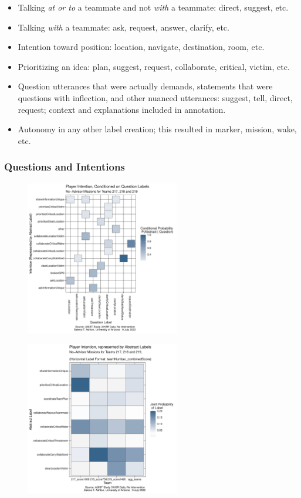 \documentclass[10pt]{article}
\begin{document}
\begin{itemize}
    \item Talking \emph{at or to} a teammate and not \emph{with} a teammate: direct, suggest, etc.
    \item Talking \emph{with} a teammate: ask, request, answer, clarify, etc.
    \item Intention toward position: location, navigate, destination, room, etc.
    \item Prioritizing an idea: plan, suggest, request, collaborate, critical, victim, etc.
    \item Question utterances that were actually demands, statements that were questions with inflection, and other nuanced utterances: suggest, tell, direct, request; context and explanations included in annotation.
    \item Autonomy in any other label creation; this resulted in marker, mission, wake, etc.
\end{itemize}



\subsubsection{Questions and Intentions}
\begin{figure}[h!]
    \centering
    \includegraphics[width=0.6\textwidth]{../figures/abstractLabel_ConditionalProbability_STA.pdf}
    \caption{ }
\end{figure}


\begin{figure}[h!]
    \centering
    \includegraphics[width=0.6\textwidth]{../figures/abstractLabelProbability_STA.pdf}
    \caption{ }
\end{figure}
\end{document}
